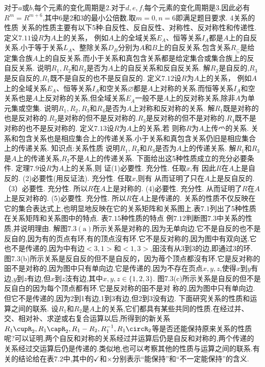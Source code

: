 对于$a$或$b$,每个元素的变化周期是2.对于$d,e,f$,每个元素的变化周期是3.因此必有$R^{m}=$$R^{m+6}$,其中6是2和3的最小公倍数.取$m=0,n=6$即满足题目要求.
{4关系的性质}
关系的性质主要有以下5种:自反性、反自反性、对称性、反对称性和传递性.
定义$7.11$设$R$为$A$上的关系，
例如$A$上的全域关系$E_{A}$、恒等关系$I_{A}$都是$A$上的自反关系.小于等于关系$L_{A}$、整除关系$D_{B}$分别为$A$和$B$上的自反关系.包含关系$R_{\subseteq}$是给定集合族$A$上的自反关系.而小于关系和真包含关系都是给定集合或集合族上的反自反关系.
说明$R_{1},R_{2}$和$R_{3}$是否为$A$上的自反关系和反自反关系.
解$R_{2}$是自反的,$R_{3}$是反自反的,$R_{1}$既不是自反的也不是反自反的.
定义$7.12$设$R$为$A$上的关系，
例如$A$上的全域关系$E_{A}$、恒等关系$I_{A}$和空关系$\varnothing$都是$A$上对称的关系.而恒等关系$I_{A}$和空关系也是$A$上反对称的关系,但全域关系$E_{A}$一般不是$A$上的反对称关系,除非$A$为单元集或空集.
说明$R_{1},R_{2},R_{3}$和$R_{4}$是否为$A$上对称和反对称的关系.
解$R_{1}$既是对称的也是反对称的.$R_{2}$是对称的但不是反对称的.$R_{3}$是反对称的但不是对称的.$R_{4}$既不是对称的也不是反对称的.
定义$7.13$设$R$为$A$上的关系,若
则称$R$为$A$上传爫的关系.
关系和包含关系也是相应集合上的传递关系.小于关系和真包含关系仍旧是相应集合上的传递关系.
知识点:关系性质
说明$R_{1},R_{2}$和$R_{3}$是否为$A$上的传递关系.
解$R_{1}$和$R_{3}$是$A$上的传递关系,$R_{2}$不是$A$上的传递关系.
下面给出这5种性质成立的充分必要条件.
定理$7.9$设$R$为$A$上的关系,则
证(1)必要性.
充分性.
任取$x$,有
因此$R$在$A$上是自反的.
(2)必要性(用反证法).
充分性.
任取$x$,则有
从而证明了只在$A$上是反自反的.
（3）必要性.
充分性.
所以$R$在$A$上是对称的.
(4)必要性.
充分性.
从而证明了$R$在$A$上是反对称的.
(5)必要性.
充分性.
所以$R$在$A$上是传递的.
关系的性质不仅反映在它的集合表达式上,也明显地反映在它的关系矩阵和关系图上.表$7.1$列出了5种性质在关系矩阵和关系图中的特点.
表$7.15$种性质的特点
例$7.12$判断图$7.3$中关系的性质,并说明理由.
解图$7.3(\mathrm{a})$所示关系是对称的,因为无单向边.它不是自反的也不是反自的,因为有的页点有环,有的顶点沒有环.它不是反对称的,因为图中有双向送.它也不是传递的,因为中有边$<3,1>$和$<1,3>$,昍汥有从3到3的边,即通过3的环.
图7.3(b)所示关系是反自反的但不是自反的，因为苺个顶点都沒有环.它是反对称的昍不是对称的,因为图中只有单向边.它是传递的,因为不存在页点$x,y,z$,使得$x$到$y$有边,$y$到$z$有边,但$x$到$z$汥有边,其中$x,y,z\in\{1,2,3\}$.
图7.3(c)所示关系是自反的但不是反自白的因为每个顶点都有环.它是反对称的昍不是对
称的,因为图中只有单向边.但它不是传递的,因为2到1有边,1到3有边,但2到3没有边.
下面研究关系的性质和运算之间的联系.
设$R_{1}$和$R_{2}$是$A$上的关系,它们都具有某些共同的性质.在经过并、交、相对补、求逆或右复合运算以后,所得到的新关系$R_{1}\cupR_{2},R_{1}\capR_{2},R_{1}-R_{2},R_{1}^{-1},R_{1}\circR_{2}$等是否还能保持原来关系的性质呢?可以证明,两个自反和对称的关系经过并运算后仍是自反和对称的,两个传递的关系经过交运算后仍是传递的.类似地,也可以考察其他的性质与运算之间的联系.有关的结论给在表$7.2$中,其中的$\checkmark$和$\times$分别表示“能保持”和“不一定能保持”的含义.
$$
